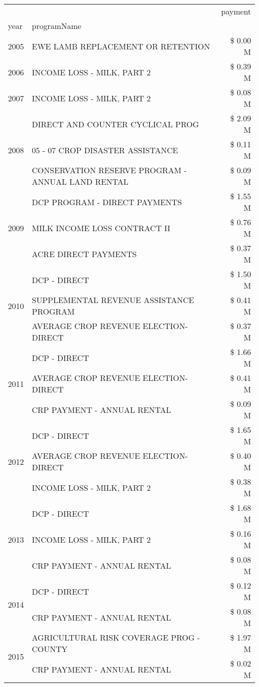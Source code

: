 \begin{tabular}{llr}
\toprule
 &  & payment \\
year & programName &  \\
\midrule
2005 & EWE LAMB REPLACEMENT OR RETENTION & \$ 0.00 M \\
\cline{1-3}
2006 & INCOME LOSS - MILK, PART 2 & \$ 0.39 M \\
\cline{1-3}
2007 & INCOME LOSS - MILK, PART 2 & \$ 0.08 M \\
\cline{1-3}
\multirow[t]{3}{*}{2008} & DIRECT AND COUNTER CYCLICAL PROG & \$ 2.09 M \\
 & 05 - 07 CROP DISASTER ASSISTANCE & \$ 0.11 M \\
 & CONSERVATION RESERVE PROGRAM - ANNUAL LAND RENTAL & \$ 0.09 M \\
\cline{1-3}
\multirow[t]{3}{*}{2009} & DCP PROGRAM - DIRECT PAYMENTS & \$ 1.55 M \\
 & MILK INCOME LOSS CONTRACT II & \$ 0.76 M \\
 & ACRE DIRECT PAYMENTS & \$ 0.37 M \\
\cline{1-3}
\multirow[t]{3}{*}{2010} & DCP - DIRECT & \$ 1.50 M \\
 & SUPPLEMENTAL REVENUE ASSISTANCE PROGRAM & \$ 0.41 M \\
 & AVERAGE CROP REVENUE ELECTION-DIRECT & \$ 0.37 M \\
\cline{1-3}
\multirow[t]{3}{*}{2011} & DCP - DIRECT & \$ 1.66 M \\
 & AVERAGE CROP REVENUE ELECTION-DIRECT & \$ 0.41 M \\
 & CRP PAYMENT - ANNUAL RENTAL & \$ 0.09 M \\
\cline{1-3}
\multirow[t]{3}{*}{2012} & DCP - DIRECT & \$ 1.65 M \\
 & AVERAGE CROP REVENUE ELECTION-DIRECT & \$ 0.40 M \\
 & INCOME LOSS - MILK, PART 2 & \$ 0.38 M \\
\cline{1-3}
\multirow[t]{3}{*}{2013} & DCP - DIRECT & \$ 1.68 M \\
 & INCOME LOSS - MILK, PART 2 & \$ 0.16 M \\
 & CRP PAYMENT - ANNUAL RENTAL & \$ 0.08 M \\
\cline{1-3}
\multirow[t]{2}{*}{2014} & DCP - DIRECT & \$ 0.12 M \\
 & CRP PAYMENT - ANNUAL RENTAL & \$ 0.08 M \\
\cline{1-3}
\multirow[t]{3}{*}{2015} & AGRICULTURAL RISK COVERAGE PROG - COUNTY & \$ 1.97 M \\
 & CRP PAYMENT - ANNUAL RENTAL & \$ 0.02 M \\

\end{tabular}
